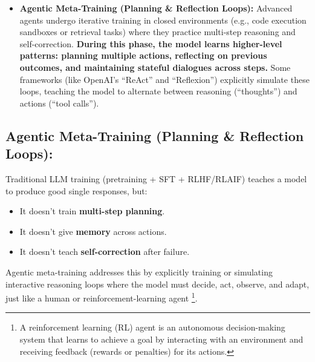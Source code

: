 \documentclass[11pt]{article}  %
\begin{document}
\begin{itemize}
\begin{itemize}
    \item \textbf{Why it works well}: (1) High-quality models can give consistent, cheap, and fast feedback.
    (2) Scales much better than hiring human raters.
    (3) Reduces bias/noise from inconsistent human annotation. 
    (4) Enables bootstrapping: we can train Model B with feedback from Model A.
    
    \item This is how Anthropic trained Claude 3 series, they call it \textbf{Constitutional AI}, which is essentially RLAIF guided by an ethical constitution rather than human labelers.
  \end{itemize}

  \item \textbf{Agentic Meta-Training (Planning \& Reflection Loops):} Advanced agents undergo iterative training in closed environments (e.g., code execution sandboxes or retrieval tasks) where they practice multi-step reasoning and self-correction.
  \textbf{During this phase, the model learns higher-level patterns: planning multiple actions, reflecting on previous outcomes, and maintaining stateful dialogues across steps.} Some frameworks (like OpenAI's  ``ReAct'' and ``Reflexion'') explicitly simulate these loops, teaching the model to alternate between reasoning (``thoughts'') and actions (``tool calls'').
\end{itemize}


\subsection{Agentic Meta-Training (Planning \& Reflection Loops):}

Traditional LLM training (pretraining + SFT + RLHF/RLAIF) teaches a model to produce good single responses, but:
\begin{itemize}
  \item It doesn't train \textbf{multi-step planning}.
  \item It doesn't give \textbf{memory} across actions.
  \item It doesn't teach \textbf{self-correction} after failure.
\end{itemize}
Agentic meta-training addresses this by explicitly training or simulating interactive reasoning loops where the model must decide, act, observe, and adapt, just like a human or reinforcement-learning agent \footnote{A reinforcement learning (RL) agent is an autonomous decision-making system that learns to achieve a goal by interacting with an environment and receiving feedback (rewards or penalties) for its actions.}.
\end{document}
